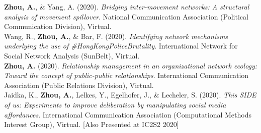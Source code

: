 \documentclass[12pt, letterpaper]{article}
\newcommand{\years}[1]{\marginnote{\normalsize #1}}
\begin{document}
{%
\years{[12]} \textbf{Zhou, A.}, \& Yang, A. (2020). \textit{Bridging inter-movement networks: A structural analysis of movement spillover}. National Communication Association (Political Communication Division), Virtual.\\
\years{[11]} Wang, R., \textbf{Zhou, A.}, \& Bar, F. (2020). \textit{Identifying network mechanisms underlying the use of \#HongKongPoliceBrutality}. International Network for Social Network Analysis (SunBelt), Virtual.\\
\years{[10]} \textbf{Zhou, A.} (2020). \textit{Relationship management in an organizational network ecology: Toward the concept of public-public relationships}. International Communication Association (Public Relations Division), Virtual.\\
\years{[9]} Jaidka, K., \textbf{Zhou, A.}, Lelkes, Y., Egelhofer, J., \& Lecheler, S. (2020). \textit{This SIDE of us: Experiments to improve deliberation by manipulating social media affordances}. International Communication Association (Computational Methods Interest Group), Virtual. [Also Presented at IC2S2 2020]\\
}
\end{document}
